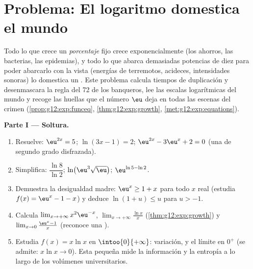 \section{Problema: El logaritmo domestica el mundo}

\begin{problem}
\label{pb:g12:exp:1}
Todo lo que crece un \emph{porcentaje} fijo crece exponencialmente (los
ahorros, las bacterias, las epidemias), y todo lo que abarca demasiadas
potencias de diez para poder abarcarlo con la vista (energías de terremotos,
acideces, intensidades sonoras) lo domestica un . Este problema
calcula tiempos de duplicación y desenmascara la regla del 72 de los
banqueros, lee las escalas logarítmicas del mundo y recoge las huellas que
el número $\eu$ deja en todas las escenas del crimen
(\cref{prop:g12:exp:funceq}, \cref{thm:g12:exp:growth},
\cref{met:g12:exp:equations}).

\medskip
\noindent\textbf{Parte I --- Soltura.}
\begin{enumerate}
  \item Resuelve: $\eu^{2x} = 5$; \quad $\ln(3x - 1) = 2$; \quad
        $\eu^{2x} - 3\eu^x + 2 = 0$ (una  de segundo grado
        disfrazada).
  \item Simplifica: $\dfrac{\ln 8}{\ln 2}$; \quad
        $\ln\!\left(\eu^3 \sqrt{\eu}\right)$; \quad
        $\eu^{\ln 5 - \ln 2}$.
  \item Demuestra la desigualdad madre: $\eu^x \geq 1 + x$ para todo $x$
        real (estudia $f(x) = \eu^x - 1 - x$) y deduce
        $\ln(1 + u) \leq u$ para $u > -1$.
  \item Calcula $\lim_{x \to +\infty} x^2 \eu^{-x}$,
        $\lim_{x \to +\infty} \frac{\ln x}{x}$
        (\cref{thm:g12:exp:growth}) y
        $\lim_{x \to 0} \frac{\eu^x - 1}{x}$ (reconoce una ).
  \item Estudia $f(x) = x \ln x$ en $\intoo{0}{+\infty}$: variación, 
        y el límite en $0^+$ (se admite: $x \ln x \to 0$). Esta pequeña
         mide la información y la entropía a lo largo de los
        volúmenes universitarios.
\end{enumerate}


\end{problem}
